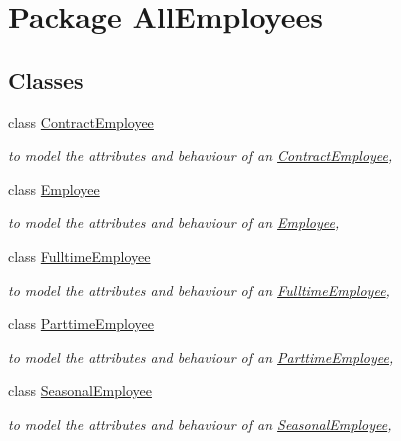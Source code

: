 \hypertarget{namespace_all_employees}{\section{Package All\-Employees}
\label{namespace_all_employees}
}
\subsection*{Classes}
\begin{DoxyCompactItemize}
\item 
class \hyperlink{class_all_employees_1_1_contract_employee}{Contract\-Employee}
\begin{DoxyCompactList}\small\item\em to model the attributes and behaviour of an \hyperlink{class_all_employees_1_1_contract_employee}{Contract\-Employee}, \end{DoxyCompactList}\item 
class \hyperlink{class_all_employees_1_1_employee}{Employee}
\begin{DoxyCompactList}\small\item\em to model the attributes and behaviour of an \hyperlink{class_all_employees_1_1_employee}{Employee}, \end{DoxyCompactList}\item 
class \hyperlink{class_all_employees_1_1_fulltime_employee}{Fulltime\-Employee}
\begin{DoxyCompactList}\small\item\em to model the attributes and behaviour of an \hyperlink{class_all_employees_1_1_fulltime_employee}{Fulltime\-Employee}, \end{DoxyCompactList}\item 
class \hyperlink{class_all_employees_1_1_parttime_employee}{Parttime\-Employee}
\begin{DoxyCompactList}\small\item\em to model the attributes and behaviour of an \hyperlink{class_all_employees_1_1_parttime_employee}{Parttime\-Employee}, \end{DoxyCompactList}\item 
class \hyperlink{class_all_employees_1_1_seasonal_employee}{Seasonal\-Employee}
\begin{DoxyCompactList}\small\item\em to model the attributes and behaviour of an \hyperlink{class_all_employees_1_1_seasonal_employee}{Seasonal\-Employee}, \end{DoxyCompactList}\end{DoxyCompactItemize}
